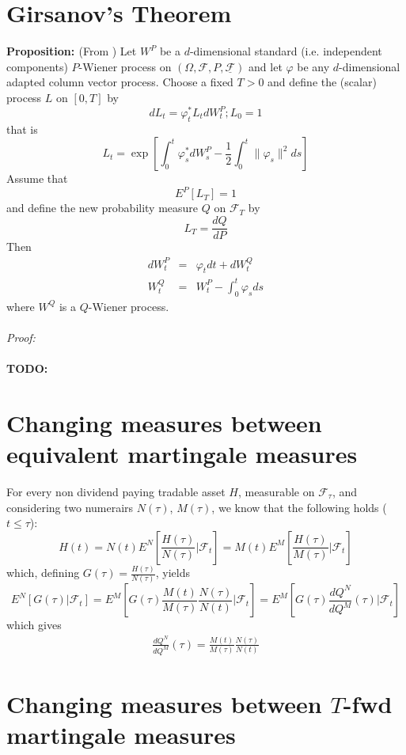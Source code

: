 \documentclass[a4paper,10pt]{report}
\theoremstyle{plain}
\theoremstyle{definition}
\newcommand{\todo}{{\bf TODO:}}
\newcommand\be{\begin{eqnarray}}    %
\newcommand\ee{\end{eqnarray}}
\newcommand{\PROP} {{\bf{Proposition: }}}
\newcommand{\PROOF} {{\emph{Proof: \\ \\}}}
\newcommand{\FF} {\mathcal{F} }
\newcommand{\FLT} {\underline{\mathcal{F}}}
\begin{document}

\section{Girsanov's Theorem}

\PROP (From \cite{Bjork}) Let $W^P$ be a $d$-dimensional standard (i.e. independent components) $P$-Wiener process on $(\Omega, \FF, P, \FLT)$ and let $\varphi$ be any $d$-dimensional adapted column vector process. Choose a fixed $T>0$ and define the (scalar) process $L$ on $[0,T]$ by
\[
dL_t=\varphi_t^* L_t dW_t^P; L_0=1
\]
that is
\[
L_t=\exp\left[\int_0^t \varphi_s^* dW_s^P -\frac{1}{2}\int_0^t \| \varphi_s\|^2 ds\right]
\]
Assume that 
\[
E^P[L_T]=1
\]
and define the new probability measure $Q$ on $\FF_T$ by
\[
L_T=\frac{dQ}{dP} 
\]
Then 
\be
dW_t^P&=&\varphi_t dt + dW_t^Q \label{girseq1}\\
W_t^Q&=&W_t^P -\int_0^t \varphi_s ds\label{girseq2}
\ee
where $W^Q$ is a $Q$-Wiener process. \\ \\
\PROOF
\todo

\section{Changing measures between equivalent martingale measures}
For every non dividend paying tradable asset $H$, measurable on $\FF_{\tau}$, and considering two numerairs $N(\tau)$, $M(\tau)$, we know that the following holds ($t\leq \tau$):
\[
H(t)=N(t) E^N\left[\frac{H(\tau)}{N(\tau)} | \FF_t \right]=M(t) E^M\left[\frac{H(\tau)}{M(\tau)} | \FF_t \right]
\]
which, defining $G(\tau)=\frac{H(\tau)}{N(\tau)}$, yields
\[
E^N\left[G(\tau)| \FF_t \right]= E^M\left[ G(\tau) \frac{M(t)}{M(\tau)} \frac{N(\tau)}{N(t)}| \FF_t \right]= E^M\left[G(\tau) \frac{dQ^N}{dQ^M}(\tau) | \FF_t \right]
\]
which gives
\be 
\frac{dQ^N}{dQ^M}(\tau) =  \frac{M(t)}{M(\tau)} \frac{N(\tau)}{N(t)}
\label{radniknumeraires}
\ee


\section{Changing measures between $T$-fwd martingale measures \label{t_fwd_measure_changes}}
\end{document}
